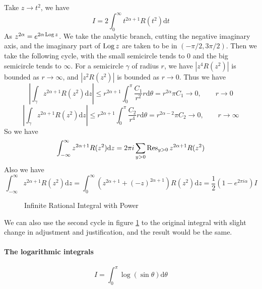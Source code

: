\documentclass[../main.tex]{subfiles}
\begin{document}
Take $z \rightarrow t^2$, we have
\begin{equation*}
	I = 2 \int_{0}^{\infty } t^{2\alpha +1} R(t^2) \mathrm{d} t
\end{equation*}
As $z^{2 \alpha} = e^{2 \alpha \operatorname{Log} z}$. We take the analytic branch, cutting the negative imaginary axis, and the imaginary part of $\operatorname{Log} z$ are taken to be in $(-\pi / 2, 3\pi / 2)$. Then we take the following cycle, with the small semicircle tends to 0 and the big semicircle tends to $\infty$. For a semicircle $\gamma$ of radius $r$, we have $\left|z^4 R(z^2)\right|$ is bounded as $r \rightarrow \infty$, and $\left|z^2 R(z^2)\right|$ is bounded as $r \rightarrow 0$. Thus we have
\begin{equation*}
	\left|\int_{\gamma} z^{2 \alpha+1} R(z^2) \mathrm{d} z \right| \leq r^{2 \alpha+1} \int_0^{\pi} \frac{C_1}{r^2} r \mathrm{d} \theta =r^{2 \alpha} \pi C_1 \rightarrow 0, \qquad r \rightarrow 0
\end{equation*}
\begin{equation*}
	\left|\int_{\gamma} z^{2 \alpha+1} R(z^2) \mathrm{d} z \right| \leq r^{2 \alpha+1} \int_0^{\pi} \frac{C_2}{r^4} r \mathrm{d} \theta =r^{2 \alpha -2} \pi C_2 \rightarrow 0, \qquad r \rightarrow \infty
\end{equation*}
So we have
\begin{equation}
	\int_{-\infty }^{\infty} z^{2 \alpha+1} R(z^2) \mathrm{d} z = 2 \pi i \sum_{y>0} \operatorname{Res}_{y>0} z^{2 \alpha+1} R(z^2)
\end{equation}
Also we have
\begin{equation}
	\int_{-\infty }^{\infty } z^{2 \alpha+1} R(z^2) \mathrm{d} z = \int_0^{\infty } (z^{2 \alpha+1} + (-z)^{2 \alpha+1}) R(z^2) \mathrm{d} z = \frac{1}{2} (1-e^{2 \pi i \alpha}) I
\end{equation}

\begin{figure}[ht]
    \centering
    \caption{Infinite Rational Integral with Power}
    \label{fig:infinite-rational-integral-with-power}
\end{figure}

\begin{remark}
	We can also use the second cycle in figure \ref{fig:infinite-rational-integral-with-power} to the original integral with slight change in adjustment and justification, and the result would be the same.
\end{remark}

\paragraph{The logarithmic integrals}
\begin{equation}
	I = \int_0^{\pi} \log (\sin \theta) \mathrm{d} \theta
\end{equation}
\end{document}
